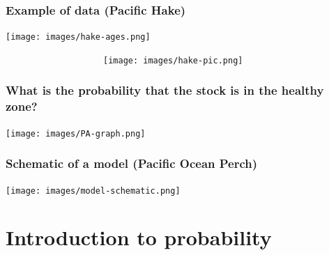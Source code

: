 
\begin{frame}
\frametitle{Example of data (Pacific Hake)}


\begin{minipage}{8cm}
\texttt{[image: images/hake-ages.png]}
\end{minipage}
\begin{minipage}{5cm}
~~~~~~~~~~~~~~~~~~~~\texttt{[image: images/hake-pic.png]}
\end{minipage}

\end{frame}


\begin{frame}
\frametitle{What is the probability that the stock is in the healthy zone?}

\centering
\texttt{[image: images/PA-graph.png]}

\end{frame}


\begin{frame}
\frametitle{Schematic of a model (Pacific Ocean Perch)}

\centering
\texttt{[image: images/model-schematic.png]}

\end{frame}


\section{Introduction to probability}
\subsection{}


